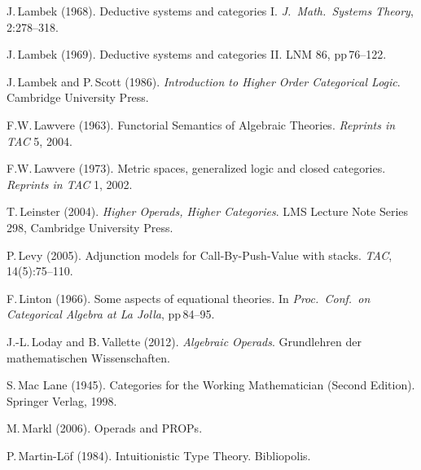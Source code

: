 \documentclass[11pt,twocolumn]{article}
\begin{document}
{\begin{thebibliography}{000}
J.\,Lambek (1968).
\newblock Deductive systems and categories I.
\newblock \emph{J.\ Math.\ Systems Theory}, 2:278--318.

J.\,Lambek (1969).
\newblock Deductive systems and categories II.
\newblock LNM 86, pp\,76--122.

J.\,Lambek and P.\,Scott (1986).
\newblock \emph{Introduction to Higher Order Categorical Logic}.
\newblock Cambridge University Press.

F.W.\,Lawvere (1963). %
\newblock Functorial Semantics of Algebraic Theories. %
\newblock \emph{Reprints in TAC} 5, 2004.
  
F.W.\,Lawvere (1973).
\newblock Metric spaces, generalized logic and closed categories.
\newblock \emph{Reprints in TAC} 1, 2002.

T.\,Leinster (2004). 
\newblock \emph{Higher Operads, Higher Categories}.
\newblock LMS Lecture Note Series 298, Cambridge
University Press.

P.\,Levy (2005).
\newblock Adjunction models for Call-By-Push-Value with stacks.
\newblock \emph{TAC}, 14(5):75--110.

F.\,Linton (1966).
\newblock Some aspects of equational theories.
\newblock In {\em Proc.\ Conf.\ on Categorical Algebra at La Jolla}, pp\,84--95.


J.-L.\,Loday and B.\,Vallette (2012).
\newblock \emph{Algebraic Operads}.
\newblock Grundlehren der mathematischen Wissenschaften.

S.\,Mac Lane (1945).
\newblock Categories for the Working Mathematician (Second Edition).
\newblock Springer Verlag, 1998.

M.\,Markl (2006). 
\newblock Operads and PROPs.

P.\,Martin-L{\"o}f (1984).
\newblock Intuitionistic Type Theory.
\newblock Bibliopolis.


\end{thebibliography}}
\end{document}
